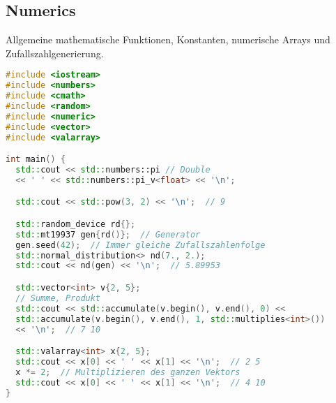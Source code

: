 \subsection{Numerics}

Allgemeine mathematische Funktionen, Konstanten, numerische Arrays und
Zufallszahlgenerierung.

\begin{lstlisting}[language=C++]
#include <iostream>
#include <numbers>
#include <cmath>
#include <random>
#include <numeric>
#include <vector>
#include <valarray>

int main() {
  std::cout << std::numbers::pi // Double
  << ' ' << std::numbers::pi_v<float> << '\n';

  std::cout << std::pow(3, 2) << '\n';  // 9

  std::random_device rd{};
  std::mt19937 gen{rd()};  // Generator
  gen.seed(42);  // Immer gleiche Zufallszahlenfolge
  std::normal_distribution<> nd(7., 2.);
  std::cout << nd(gen) << '\n';  // 5.89953

  std::vector<int> v{2, 5};
  // Summe, Produkt
  std::cout << std::accumulate(v.begin(), v.end(), 0) <<
  std::accumulate(v.begin(), v.end(), 1, std::multiplies<int>())
  << '\n';  // 7 10

  std::valarray<int> x{2, 5};
  std::cout << x[0] << ' ' << x[1] << '\n';  // 2 5
  x *= 2;  // Multiplizieren des ganzen Vektors
  std::cout << x[0] << ' ' << x[1] << '\n';  // 4 10
}
\end{lstlisting}


